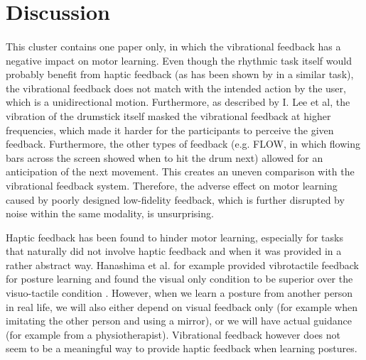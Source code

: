 \pagebreak

\section{Discussion}

\paragraph{}
This cluster contains one paper only, in which the vibrational feedback has a negative impact on motor learning. Even though the rhythmic task itself would probably benefit from haptic feedback (as has been shown by \cite{Graham2008} in a similar task), the vibrational feedback does not match with the intended action by the user, which is a unidirectional motion. Furthermore, as described by I. Lee et al, the vibration of the drumstick itself masked the vibrational feedback at higher frequencies, which made it harder for the participants to perceive the given feedback. Furthermore, the other types of feedback (e.g. FLOW, in which flowing bars across the screen showed when to hit the drum next) allowed for an anticipation of the next movement. This creates an uneven comparison with the vibrational feedback system. Therefore, the adverse effect on motor learning caused by poorly designed low-fidelity feedback, which is further disrupted by noise within the same modality, is unsurprising.


Haptic feedback has been found to hinder motor learning, especially for tasks that naturally did not involve haptic feedback and when it was provided in a rather abstract way. Hanashima et al. for example provided vibrotactile feedback for posture learning and found the visual only condition to be superior over the visuo-tactile condition \cite{Hanashima2023}. However, when we learn a posture from another person in real life, we will also either depend on visual feedback only (for example when imitating the other person and using a mirror), or we will have actual guidance (for example from a physiotherapist). Vibrational feedback however does not seem to be a meaningful way to provide haptic feedback when learning postures.

